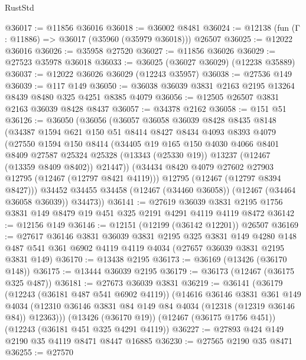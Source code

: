 \begin{lexlean}{RustStd}
\begin{coremodule}
@36017 := @11856 @36016
@36018 := @36002 @8481
@36024 := @12138 (fun (Γ : @11886) => @36017 (@35960 (@35979 @36018))) @26507
@36025 := @12022 @36016
@36026 := @35958 @27520
@36027 := @11856 @36026
@36029 := @27523 @35978 @36018
@36033 := @36025 (@36027 @36029) (@12238 @35889)
@36037 := @12022 @36026 @36029 (@12243 @35957)
@36038 := @27536 @149
@36039 := @117 @149
@36050 := @36038 @36039 @3831 @2163 @2195 @13264 @8439 @8480 @325 @4251 @8385 @4079
@36056 := @12505 @26507 @3831 @2163 @36039 @8428 @8437
@36057 := @34378 @2162
@36058 := @151 @51
@36126 := @36050
    (@36056
      (@36057
        @36058
        @36039
        @8428
        @8435
        @8148
        (@34387
          @1594
          @621
          @150
          @51
          @8414
          @8427
          @8434
          @4093
          @8393
          @4079
          (@27550
            @1594
            @150
            @8414
            (@34405
              @19
              @165
              @150
              @4030
              @4066
              @8401
              @8409
              @27587
              @25324
              @25328
              (@13343 (@25330 @19))
              @13237
              (@12467 (@13359 @8409 @8402))
              @21447))
          (@34434 @8420 @4079 @27602 @27903 @12795 (@12467 (@12797 @8421 @4119)))
          @12795
          (@12467 (@12797 @8394 @8427)))
        @34452
        @34455
        @34458
        (@12467 (@34460 @36058))
        (@12467 (@34464 @36058 @36039))
        @34473))
@36141 := @27619
    @36039
    @3831
    @2195
    @1756
    @3831
    @149
    @8479
    @19
    @451
    @325
    @2191
    @4291
    @4119
    @4119
    @8472
@36142 := @12156 @149
@36146 := @12151 (@12199 (@36142 @12201)) @26507
@36169 := @27617
    @36146
    @3831
    @36039
    @3831
    @2195
    @325
    @3831
    @149
    @4280
    @148
    @487
    @541
    @361
    @6902
    @4119
    @4119
    @4034
    (@27657 @36039 @3831 @2195 @3831 @149)
@36170 := @13438 @2195
@36173 := @36169 (@13426 (@36170 @148))
@36175 := @13444 @36039 @2195
@36179 := @36173 (@12467 (@36175 @325 @487))
@36181 := @27673 @36039 @3831
@36219 := @36141
    (@36179
      (@12243 (@36181 @487 @541 @6902 @4119))
      (@14616
        @36146
        @3831
        @361
        @149
        @4034
        (@12310 @36146 @3831 @84 @149 @84 @4034 (@12318 (@12319 @36146 @84)) @12363)))
    (@13426 (@36170 @19))
    (@12467 (@36175 @1756 @451))
    (@12243 (@36181 @451 @325 @4291 @4119))
@36227 := @27893 @424 @149 @2190 @35 @4119 @8471 @8447 @16885
@36230 := @27565 @2190 @35 @8471
@36255 := @27570

\end{coremodule}
\end{lexlean}
